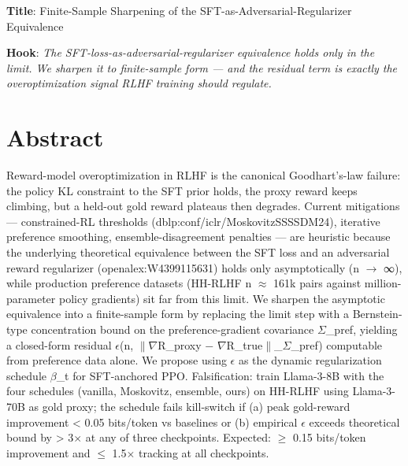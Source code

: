 \documentclass[10pt,a4paper]{article}
\begin{document}
\begin{tcolorbox}[colback=bgskill, colframe=cblue, title=\textbf{NoveltySkill — Idea Card (L3 Oral-Ready)}, breakable]

\textbf{Title}: Finite-Sample Sharpening of the SFT-as-Adversarial-Regularizer Equivalence

\textbf{Hook}: \emph{ The SFT-loss-as-adversarial-regularizer equivalence holds only in the limit. We sharpen it to finite-sample form --- and the residual term is exactly the overoptimization signal RLHF training should regulate. }

\section*{Abstract}
Reward-model overoptimization in RLHF is the canonical Goodhart's-law failure: the policy KL constraint to the SFT prior holds, the proxy reward keeps climbing, but a held-out gold reward plateaus then degrades. Current mitigations --- constrained-RL thresholds (dblp:conf/iclr/MoskovitzSSSSDM24), iterative preference smoothing, ensemble-disagreement penalties --- are heuristic because the underlying theoretical equivalence between the SFT loss and an adversarial reward regularizer (openalex:W4399115631) holds only asymptotically (n $\to$ ∞), while production preference datasets (HH-RLHF n $\approx$ 161k pairs against million-parameter policy gradients) sit far from this limit. We sharpen the asymptotic equivalence into a finite-sample form by replacing the limit step with a Bernstein-type concentration bound on the preference-gradient covariance $\Sigma$\_pref, yielding a closed-form residual $\epsilon$(n, $\|$$\nabla$R\_proxy − $\nabla$R\_true$\|$\_$\Sigma$\_pref) computable from preference data alone. We propose using $\epsilon$ as the dynamic regularization schedule $\beta$\_t for SFT-anchored PPO. Falsification: train Llama-3-8B with the four schedules (vanilla, Moskovitz, ensemble, ours) on HH-RLHF using Llama-3-70B as gold proxy; the schedule fails kill-switch if (a) peak gold-reward improvement < 0.05 bits/token vs baselines or (b) empirical $\epsilon$ exceeds theoretical bound by > 3$\times$ at any of three checkpoints. Expected: $\ge$ 0.15 bits/token improvement and $\le$ 1.5$\times$ tracking at all checkpoints.


\end{tcolorbox}
\end{document}
